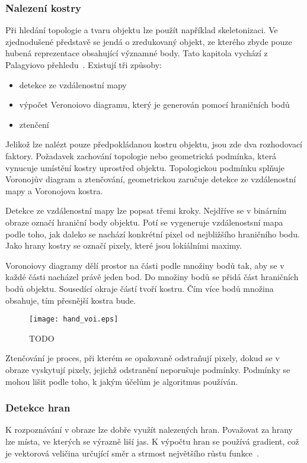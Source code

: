 \subsubsection{Nalezení kostry}
Při hledání topologie a tvaru objektu lze použít například skeletonizaci. Ve zjednodušené představě se jendá o zredukovaný objekt, ze kterého zbyde pouze hubená reprezentace obsahující významné body. Tato kapitola vychází z Palagyiovo přehledu~\cite{25}. Existují tři způsoby:

\begin{itemize}
\item detekce ze vzdálenostní mapy
\item výpočet Veronoiovo diagramu, který je generován pomocí hraničních bodů
\item ztenčení
\end{itemize}

Jelikož lze nalézt pouze předpokládanou kostru objektu, jsou zde dva rozhodovací faktory. Požadavek zachování topologie %
nebo geometrická podmínka, která vynucuje umístění kostry uprostřed objektu. Topologickou podmínku splňuje Voronojův diagram a ztenčování, geometrickou zaručuje detekce ze vzdálenostní mapy a Voronojova kostra.

Detekce ze vzdálenostní mapy lze popsat třemi kroky. Nejdříve se v binárním obraze označí hraniční body objektu. Potí se vygeneruje vzdálenostsní mapa podle toho, jak daleko se nachází konkrétní pixel od nejbližšího hraničního bodu. Jako hrany kostry se označí pixely, které jsou lokíálními maximy.

Voronoiovy diagramy dělí prostor na části podle množiny bodů tak, aby se v každé části nacházel právě jeden bod. Do množiny bodů se přidá část hraničních bodů objektu. Sousedící okraje částí tvoří kostru. Čím více bodů množina obsahuje, tím přesnější kostra bude.
\begin{figure}[h]
\centering
\texttt{[image: hand\_voi.eps]}
\caption{TODO}
\label{picVoi}
\end{figure}

Ztenčování je proces, při kterém se opakovaně odstraňují pixely, dokud se v obraze vyskytují pixely, jejichž odstranění neporušuje podmínky. Podmínky se mohou lišit podle toho, k jakým účelům je algoritmus používán.

\subsubsection{Detekce hran}
K rozpoznávání v obraze lze dobře využít nalezených hran. Považovat za hrany lze místa, ve kterých se výrazně liší jas. K výpočtu hran se používá gradient, což je vektorová veličina určující směr a strmost největšího růstu funkce~\cite{hlav}.

